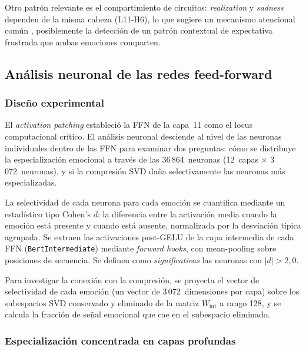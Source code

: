 Otro patrón relevante es el compartimiento de circuitos:
\emph{realization} y \emph{sadness} dependen de la misma cabeza
(L11-H6), lo que sugiere un mecanismo atencional común
, posiblemente la detección de un patrón contextual de expectativa
frustrada que ambas emociones comparten.



\subsection{Análisis neuronal de las redes feed-forward}
\label{sec:neuron-analysis}

\subsubsection{Diseño experimental}

El \emph{activation patching} estableció la FFN de la capa~11 como el locus
computacional crítico. El análisis neuronal desciende al nivel de las
neuronas individuales dentro de las FFN para examinar dos preguntas:
cómo se distribuye la especialización emocional a través de las
36\,864~neuronas (12~capas $\times$ 3\,072~neuronas), y si la
compresión SVD daña selectivamente las neuronas más especializadas.

La selectividad de cada neurona para cada emoción se cuantifica
mediante un estadístico tipo Cohen's $d$: la diferencia entre la
activación media cuando la emoción está presente y cuando está
ausente, normalizada por la desviación típica agrupada. Se extraen
las activaciones post-GELU de la capa intermedia de cada FFN
(\texttt{BertIntermediate}) mediante \textit{forward hooks}, con
mean-pooling sobre posiciones de secuencia. Se definen como
\emph{significativas} las neuronas con $|d| > 2{,}0$.

Para investigar la conexión con la compresión, se proyecta el vector
de selectividad de cada emoción (un vector de 3\,072~dimensiones por
capa) sobre los subespacios SVD conservado y eliminado de la matriz
$W_{\text{int}}$ a rango 128, y se calcula la fracción de señal
emocional que cae en el subespacio eliminado.

\subsubsection{Especialización concentrada en capas profundas}

